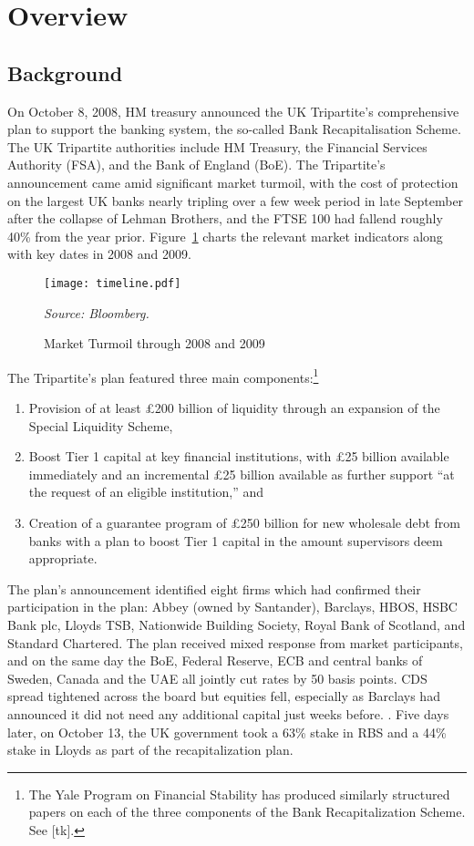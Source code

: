\documentclass[12pt]{article}
\begin{document}
\section{Overview}

\subsection{Background}

On October 8, 2008, HM treasury announced the UK Tripartite's comprehensive plan to support the banking system, the so-called Bank Recapitalisation Scheme. The UK Tripartite authorities include HM Treasury, the Financial Services Authority (FSA), and the Bank of England (BoE). The Tripartite's announcement came amid significant market turmoil, with the cost of protection on the largest UK banks nearly tripling over a few week period in late September after the collapse of Lehman Brothers, and the FTSE 100 had fallend roughly 40\% from the year prior. Figure~\ref{timeline} charts the relevant market indicators along with key dates in 2008 and 2009. 

\begin{figure}[h]
\caption{Market Turmoil through 2008 and 2009}\label{timeline}
\centering
\texttt{[image: timeline.pdf]}
\raggedright
\textit{\footnotesize Source: Bloomberg.}
\end{figure}

The Tripartite's plan featured three main components:\footnote{The Yale Program on Financial Stability has produced similarly structured papers on each of the three components of the Bank Recapitalization Scheme. See [tk].}

\begin{enumerate}
\item Provision of at least \pounds 200 billion of liquidity through an expansion of the Special Liquidity Scheme,
\item Boost Tier 1 capital at key financial institutions, with \pounds 25 billion available immediately and an incremental \pounds 25 billion available as further support ``at the request of an eligible institution,'' and
\item Creation of a guarantee program of \pounds 250 billion for new wholesale debt from banks with a plan to boost Tier 1 capital in the amount supervisors deem appropriate. 
\end{enumerate}

The plan's announcement identified eight firms which had confirmed their participation in the plan: Abbey (owned by Santander), Barclays, HBOS, HSBC Bank plc, Lloyds TSB, Nationwide Building Society, Royal Bank of Scotland, and Standard Chartered. The plan received mixed response from market participants, and on the same day the BoE, Federal Reserve, ECB and central banks of Sweden, Canada and the UAE all jointly cut rates by 50 basis points. CDS spread tightened across the board but equities fell, especially as Barclays had announced it did not need any additional capital just weeks before. \citep{BRSAnnouncement}. Five days later, on October 13, the UK government took a 63\% stake in RBS and a 44\% stake in Lloyds as part of the recapitalization plan.
\end{document}
